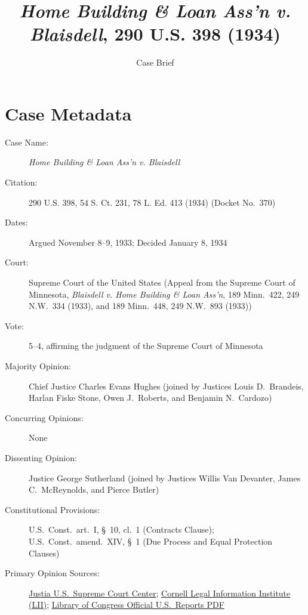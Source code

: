 \documentclass[12pt]{article}
\title{\textit{Home Building \& Loan Ass'n v. Blaisdell}, 290 U.S. 398 (1934)}
\author{Case Brief}
\date{}
\begin{document}
\maketitle


\section{Case Metadata}

\begin{description}
  \item[Case Name:] \emph{Home Building \& Loan Ass'n v. Blaisdell}
  \item[Citation:] 290 U.S. 398, 54 S. Ct. 231, 78 L. Ed. 413 (1934) (Docket No.\ 370)
  \item[Dates:] Argued November 8--9, 1933; Decided January 8, 1934
  \item[Court:] Supreme Court of the United States (Appeal from the Supreme Court of Minnesota, \emph{Blaisdell v. Home Building \& Loan Ass'n}, 189 Minn.\ 422, 249 N.W.\ 334 (1933), and 189 Minn.\ 448, 249 N.W.\ 893 (1933))
  \item[Vote:] 5--4, affirming the judgment of the Supreme Court of Minnesota
  \item[Majority Opinion:] Chief Justice Charles Evans Hughes (joined by Justices Louis D.\ Brandeis, Harlan Fiske Stone, Owen J.\ Roberts, and Benjamin N.\ Cardozo)
  \item[Concurring Opinions:] None
  \item[Dissenting Opinion:] Justice George Sutherland (joined by Justices Willis Van Devanter, James C.\ McReynolds, and Pierce Butler)
  \item[Constitutional Provisions:] U.S.\ Const.\ art.\ I, \S\ 10, cl.\ 1 (Contracts Clause); U.S.\ Const.\ amend.\ XIV, \S\ 1 (Due Process and Equal Protection Clauses)
  \item[Primary Opinion Sources:] \href{https://supreme.justia.com/cases/federal/us/290/398/}{Justia U.S.\ Supreme Court Center}; \href{https://www.law.cornell.edu/supremecourt/text/290/398}{Cornell Legal Information Institute (LII)}; \href{https://tile.loc.gov/storage-services/service/ll/usrep/usrep290/usrep290398/usrep290398.pdf}{Library of Congress Official U.S.\ Reports PDF}
\end{description}
\end{document}
